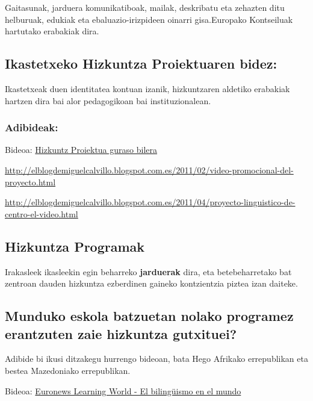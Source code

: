 \documentclass[]{book}
\begin{document}
Gaitasunak, jarduera komunikatiboak, mailak, deskribatu eta zehazten ditu helburuak, edukiak eta ebaluazio-irizpideen oinarri gisa.Europako Kontseiluak hartutako erabakiak dira.

\hypertarget{ikastetxeko-hizkuntza-proiektuaren-bidez}{%
\subsection{Ikastetxeko Hizkuntza Proiektuaren bidez:}\label{ikastetxeko-hizkuntza-proiektuaren-bidez}}

Ikastetxeak duen identitatea kontuan izanik, hizkuntzaren aldetiko erabakiak hartzen dira bai alor pedagogikoan bai instituzionalean.

\hypertarget{adibideak}{%
\subsubsection{Adibideak:}\label{adibideak}}

Bideoa: \href{http://www.youtube.com/embed/iFEjAhnv3ys?rel=0}{Hizkuntz Proiektua guraso bilera}

\url{http://elblogdemiguelcalvillo.blogspot.com.es/2011/02/video-promocional-del-proyecto.html}

\url{http://elblogdemiguelcalvillo.blogspot.com.es/2011/04/proyecto-linguistico-de-centro-el-video.html}

\hypertarget{hizkuntza-programak}{%
\subsection{Hizkuntza Programak}\label{hizkuntza-programak}}

Irakasleek ikasleekin egin beharreko \textbf{jarduerak }dira, eta betebeharretako bat zentroan dauden hizkuntza ezberdinen gaineko kontzientzia piztea izan daiteke.

\hypertarget{munduko-eskola-batzuetan-nolako-programez-erantzuten-zaie-hizkuntza-gutxituei}{%
\subsection{Munduko eskola batzuetan nolako programez erantzuten zaie hizkuntza gutxituei?}\label{munduko-eskola-batzuetan-nolako-programez-erantzuten-zaie-hizkuntza-gutxituei}}

Adibide bi ikusi ditzakegu hurrengo bideoan, bata Hego Afrikako errepublikan eta bestea Mazedoniako errepublikan.

Bideoa: \href{http://www.youtube.com/embed/nPUMvUBuX00?rel=0}{Euronews Learning World - El bilingüismo en el mundo}
\end{document}
